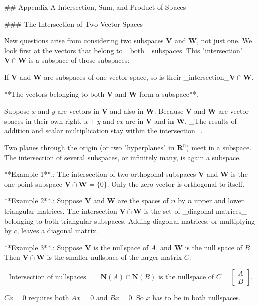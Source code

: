 

## Appendix A Intersection, Sum, and Product of Spaces

### The Intersection of Two Vector Spaces

New questions arise from considering two subspaces \(\mathbf{V}\) and \(\mathbf{W}\), not just one. We look first at the vectors that belong to _both_ subspaces. This "intersection" \(\mathbf{V}\cap\mathbf{W}\) is a subspace of those subspaces:

If \(\mathbf{V}\) and \(\mathbf{W}\) are subspaces of one vector space, so is their _intersection_\(\mathbf{V}\cap\mathbf{W}\).

**The vectors belonging to both \(\mathbf{V}\) and \(\mathbf{W}\) form a subspace**.

Suppose \(x\) and \(y\) are vectors in \(\mathbf{V}\) and also in \(\mathbf{W}\). Because \(\mathbf{V}\) and \(\mathbf{W}\) are vector spaces in their own right, \(x+y\) and \(cx\) are in \(\mathbf{V}\) and in \(\mathbf{W}\). _The results of addition and scalar multiplication stay within the intersection_.

Two planes through the origin (or two "hyperplanes" in \(\mathbf{R}^{n}\)) meet in a subspace. The intersection of several subspaces, or infinitely many, is again a subspace.

**Example 1**.: The intersection of two orthogonal subspaces \(\mathbf{V}\) and \(\mathbf{W}\) is the one-point subspace \(\mathbf{V}\cap\mathbf{W}=\{0\}\). Only the zero vector is orthogonal to itself.

**Example 2**.: Suppose \(\mathbf{V}\) and \(\mathbf{W}\) are the spaces of \(n\) by \(n\) upper and lower triangular matrices. The intersection \(\mathbf{V}\cap\mathbf{W}\) is the set of _diagonal matrices_--belonging to both triangular subspaces. Adding diagonal matrices, or multiplying by \(c\), leaves a diagonal matrix.

**Example 3**.: Suppose \(\mathbf{V}\) is the nullspace of \(A\), and \(\mathbf{W}\) is the null space of \(B\). Then \(\mathbf{V}\cap\mathbf{W}\) is the smaller nullspace of the larger matrix \(C\):

\[\text{{Intersection of nullspaces}}\qquad\mathbf{N}(A)\cap\mathbf{N}(B)\text{ is the nullspace of }C=\begin{bmatrix}A\\ B\end{bmatrix}\text{.}\]

\(Cx=0\) requires both \(Ax=0\) and \(Bx=0\). So \(x\) has to be in both nullspaces.

